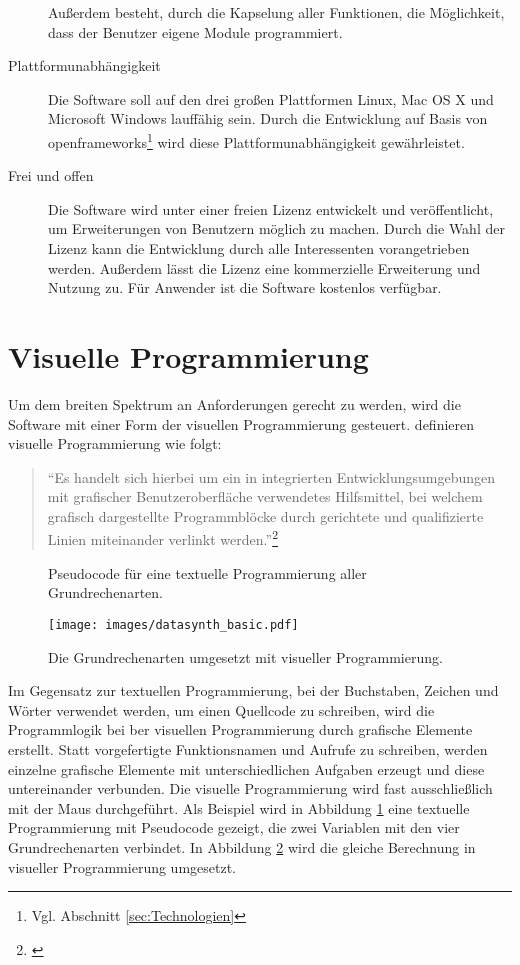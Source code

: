 \documentclass[a4paper, 
               12pt,
               DIV=calc,
               version=first,
               pdftex,
               headsepline,
               footsepline,
               bibliography=totocnumbered,
               listof=numbered]{scrreprt}
\begin{document}
\begin{description}
Außerdem besteht, durch die Kapselung aller Funktionen, die Möglichkeit, dass der
Benutzer eigene Module programmiert.
\item[Plattformunabhängigkeit]
Die Software soll auf den drei großen Plattformen Linux, Mac OS X und Microsoft Windows
lauffähig sein. Durch die Entwicklung auf Basis von openframeworks\footnote{Vgl. Abschnitt \ref{sec:Technologien}}
wird diese Plattformunabhängigkeit gewährleistet.
\item[Frei und offen]
Die Software wird unter einer freien Lizenz entwickelt und veröffentlicht,
um Erweiterungen von Benutzern möglich zu machen. Durch die Wahl der Lizenz kann
die Entwicklung durch alle Interessenten vorangetrieben werden. Außerdem lässt
die Lizenz eine kommerzielle Erweiterung und Nutzung zu. Für Anwender
ist die Software kostenlos verfügbar.
\end{description}

\section{Visuelle Programmierung}
\label{sec:visPro}
Um dem breiten Spektrum an Anforderungen gerecht zu werden,
wird die Software mit einer Form der visuellen Programmierung gesteuert.
\cite{Henning} definieren visuelle Programmierung wie folgt:
\begin{quote}
"`Es handelt sich hierbei um ein in integrierten Entwicklungsumgebungen mit
grafischer Benutzeroberfläche verwendetes Hilfsmittel, bei welchem grafisch
dargestellte Programmblöcke durch gerichtete und qualifizierte Linien miteinander
verlinkt werden."'\footnote{\citep[S.\,56]{Henning}}
\end{quote}
\begin{figure}
\centering

\caption{Pseudocode für eine textuelle Programmierung aller Grundrechenarten.}
\label{fig:textuell}
\end{figure}
\begin{figure}
\centering
\texttt{[image: images/datasynth\_basic.pdf]}
\caption{Die Grundrechenarten umgesetzt mit visueller Programmierung.}
\label{fig:datasynth_basic}
\end{figure}
Im Gegensatz zur textuellen Programmierung, bei der Buchstaben, Zeichen und Wörter
verwendet werden, um einen Quellcode zu schreiben, wird die Programmlogik bei ber
visuellen Programmierung durch grafische Elemente erstellt.
Statt vorgefertigte Funktionsnamen und Aufrufe zu schreiben, werden einzelne grafische
Elemente mit unterschiedlichen Aufgaben erzeugt und diese untereinander verbunden. Die visuelle Programmierung
wird fast ausschließlich mit der Maus durchgeführt.
Als Beispiel wird in Abbildung \ref{fig:textuell} eine textuelle Programmierung mit
Pseudocode gezeigt, die zwei Variablen mit den vier Grundrechenarten verbindet.
In Abbildung \ref{fig:datasynth_basic} wird die gleiche Berechnung
in visueller Programmierung umgesetzt.
\end{document}
